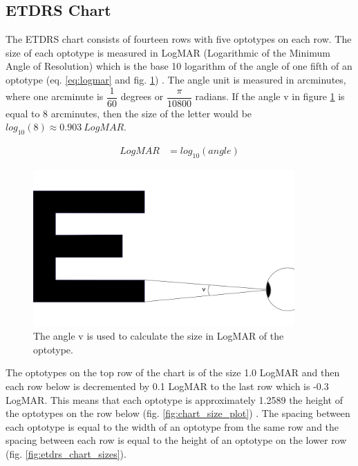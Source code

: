 \documentclass[12pt,a4paper,notitlepage]{report}
\begin{document}
\subsection{ETDRS Chart}
The ETDRS chart consists of fourteen rows with five optotypes on each row. The size of each optotype is measured in LogMAR (Logarithmic of the Minimum Angle of Resolution) which is the base 10 logarithm of the angle of one fifth of an optotype (eq. \ref{eq:logmar} and fig. \ref{fig:logmar_calculation}) \cite{Bailey}. The angle unit is measured in arcminutes, where one arcminute is $\dfrac{1}{60}$ degrees or $\dfrac{\pi}{10800}$ radians. If the angle v in figure \ref{fig:logmar_calculation} is equal to 8 arcminutes, then the size of the letter would be $log_{10}(8) \approx 0.903\ LogMAR$.


\begin{equation}
	\begin{split}
  		LogMAR & = log_{10}(angle)
  	\end{split}
  	\label{eq:logmar}
\end{equation}

\begin{figure}[ht!]
\centering
\includegraphics[width=100mm]{images/logmar_calculation.png}
\caption{The angle v is used to calculate the size in LogMAR of the optotype.\label{fig:logmar_calculation}}
\end{figure} 

The optotypes on the top row of the chart is of the size 1.0 LogMAR and then each row below is decremented by 0.1 LogMAR to the last row which is -0.3 LogMAR. This means that each optotype is approximately 1.2589 the height of the optotypes on the row below (fig. \ref{fig:chart_size_plot}) \cite{Ferris}. The spacing between each optotype is equal to the width of an optotype from the same row and the spacing between each row is equal to the height of an optotype on the lower row (fig. \ref{fig:etdrs_chart_sizes}).
\end{document}
